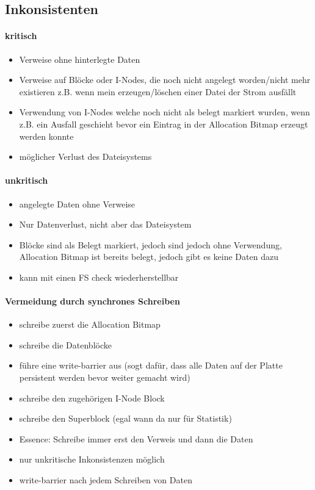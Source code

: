\documentclass[12pt,a4paper]{article}
\begin{document}
\subsection{Inkonsistenten}
\paragraph{kritisch}
\flushleft
\begin{itemize}
\item Verweise ohne hinterlegte Daten
\item Verweise auf Blöcke oder I-Nodes, die noch nicht angelegt worden/nicht mehr existieren z.B. wenn mein erzeugen/löschen einer Datei der Strom ausfällt
\item Verwendung von I-Nodes welche noch nicht als belegt markiert wurden, wenn z.B. ein Ausfall geschieht bevor ein Eintrag in der Allocation Bitmap erzeugt werden konnte
\item möglicher Verlust des Dateisystems
\end{itemize}
\paragraph{unkritisch}
\flushleft
\begin{itemize}
\item angelegte Daten ohne Verweise
\item Nur Datenverlust, nicht aber das Dateisystem 
\item Blöcke sind als Belegt markiert, jedoch sind jedoch ohne Verwendung, Allocation Bitmap ist bereits belegt, jedoch gibt es keine Daten dazu
\item kann mit einen FS check wiederherstellbar
\end{itemize}

\paragraph{Vermeidung durch synchrones Schreiben}
\flushleft
\begin{itemize}
\item schreibe zuerst die Allocation Bitmap
\item schreibe die Datenblöcke
\item führe eine write-barrier aus (sogt dafür, dass alle Daten auf der Platte persistent werden bevor weiter gemacht wird)
\item schreibe den zugehörigen I-Node Block
\item schreibe den Superblock (egal wann da nur für Statistik)
\item Essence: Schreibe immer erst den Verweis und dann die Daten
\item nur unkritische Inkonsistenzen möglich
\item write-barrier nach jedem Schreiben von Daten
\end{itemize}
\end{document}
